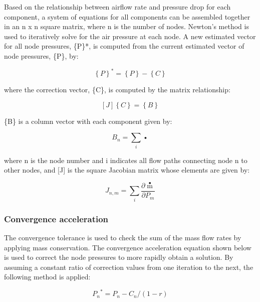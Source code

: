 Based on the relationship between airflow rate and pressure drop for each component, a system of equations for all components can be assembled together in an n x n square matrix, where n is the number of nodes. Newton's method is used to iteratively solve for the air pressure at each node. A new estimated vector for all node pressures, \{P\}*, is computed from the current estimated vector of node pressures, \{P\}, by:

\begin{equation}
{\left\{ P \right\}^*} = \left\{ P \right\} - \left\{ C \right\}
\end{equation}

where the correction vector, \{C\}, is computed by the matrix relationship:

\begin{equation}
\left[ J \right]\left\{ C \right\} = \left\{ B \right\}
\end{equation}

\{B\} is a column vector with each component given by:

\begin{equation}
{B_n} = \sum\limits_i {\mathop {{m_i}}\limits^ \bullet  }
\end{equation}

where n is the node number and i indicates all flow paths connecting node n to other nodes, and {[}J{]} is the square Jacobian matrix whose elements are given by:

\begin{equation}
{J_{n,m}} = \sum\limits_i {\frac{{\partial \mathop m\limits^ \bullet  }}{{\partial {P_m}}}}
\end{equation}

\subsubsection{Convergence acceleration}\label{convergence-acceleration}

The convergence tolerance is used to check the sum of the mass flow rates by applying mass conservation. The convergence acceleration equation shown below is used to correct the node pressures to more rapidly obtain a solution. By assuming a constant ratio of correction values from one iteration to the next, the following method is applied:

\begin{equation}
{P_n}^* = {P_n} - {C_n}/(1 - r)
\end{equation}

